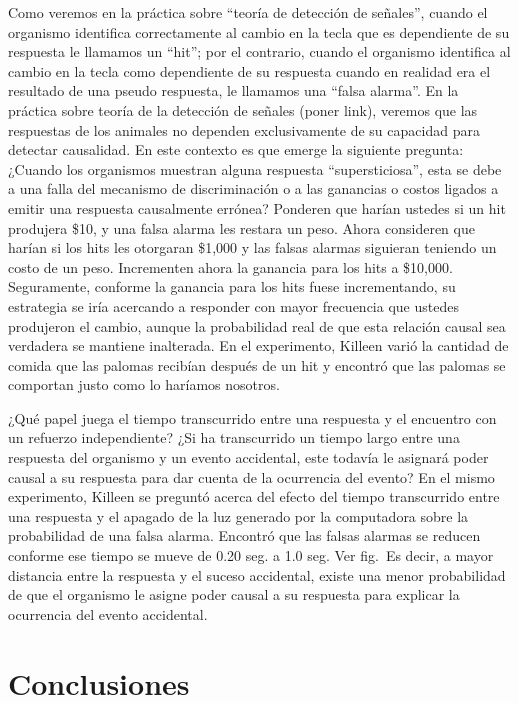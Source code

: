 \documentclass[
  letterpaper,
]{book}
\begin{document}
Como veremos en la práctica sobre ``teoría de detección de señales'',
cuando el organismo identifica correctamente al cambio en la tecla que
es dependiente de su respuesta le llamamos un ``hit''; por el contrario,
cuando el organismo identifica al cambio en la tecla como dependiente de
su respuesta cuando en realidad era el resultado de una pseudo
respuesta, le llamamos una ``falsa alarma''. En la práctica sobre teoría
de la detección de señales (poner link), veremos que las respuestas de
los animales no dependen exclusivamente de su capacidad para detectar
causalidad. En este contexto es que emerge la siguiente pregunta:
¿Cuando los organismos muestran alguna respuesta ``supersticiosa'', esta
se debe a una falla del mecanismo de discriminación o a las ganancias o
costos ligados a emitir una respuesta causalmente errónea? Ponderen que
harían ustedes si un hit produjera \$10, y una falsa alarma les restara
un peso. Ahora consideren que harían si los hits les otorgaran \$1,000 y
las falsas alarmas siguieran teniendo un costo de un peso. Incrementen
ahora la ganancia para los hits a \$10,000. Seguramente, conforme la
ganancia para los hits fuese incrementando, su estrategia se iría
acercando a responder con mayor frecuencia que ustedes produjeron el
cambio, aunque la probabilidad real de que esta relación causal sea
verdadera se mantiene inalterada. En el experimento, Killeen varió la
cantidad de comida que las palomas recibían después de un hit y encontró
que las palomas se comportan justo como lo haríamos nosotros.

¿Qué papel juega el tiempo transcurrido entre una respuesta y el
encuentro con un refuerzo independiente? ¿Si ha transcurrido un tiempo
largo entre una respuesta del organismo y un evento accidental, este
todavía le asignará poder causal a su respuesta para dar cuenta de la
ocurrencia del evento? En el mismo experimento, Killeen se preguntó
acerca del efecto del tiempo transcurrido entre una respuesta y el
apagado de la luz generado por la computadora sobre la probabilidad de
una falsa alarma. Encontró que las falsas alarmas se reducen conforme
ese tiempo se mueve de 0.20 seg. a 1.0 seg. Ver fig.~Es decir, a mayor
distancia entre la respuesta y el suceso accidental, existe una menor
probabilidad de que el organismo le asigne poder causal a su respuesta
para explicar la ocurrencia del evento accidental.

\section{Conclusiones}\label{conclusiones}
\end{document}
